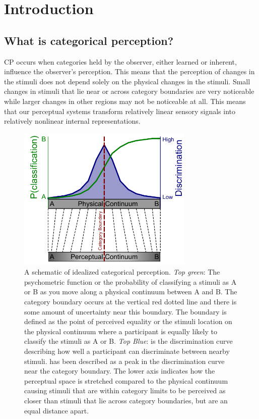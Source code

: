 \section{Introduction}
\subsection{What is categorical perception?}

\acf{CP} occurs when categories held by the observer, either learned or inherent, influence the observer’s perception. This means that the perception of changes in the stimuli does not depend solely on the physical changes in the stimuli. Small changes in stimuli that lie near or across category boundaries are very noticeable while larger changes in other regions may not be noticeable at all. This means that our perceptual systems transform relatively linear sensory signals into relatively nonlinear internal representations.

\begin{figure}[hp] 
  \centering
  \includegraphics[width=0.75\textwidth]{figures/cp_def.pdf}
  \caption[A schematic of idealized categorical perception]
{A schematic of idealized categorical perception. \emph{Top green}: The psychometric function or the probability of classifying a stimuli as A or B as you move along a physical continuum between A and B. The category boundary occurs at the vertical red dotted line and there is some amount of uncertainty near this boundary. The boundary is defined as the point of perceived equality or the stimuli location on the physical continuum where a participant is equally likely to classify the stimuli as A or B. \emph{Top Blue}: is the discrimination curve describing how well a participant can discriminate between nearby stimuli. \CP has been described as a peak in the discrimination curve near the category boundary. The lower axis indicates how the perceptual space is stretched compared to the physical continuum causing stimuli that are within category limits to be perceived as closer than stimuli that lie across category boundaries, but are an equal distance apart.}
  \label{fig:cpdef}
\end{figure}

